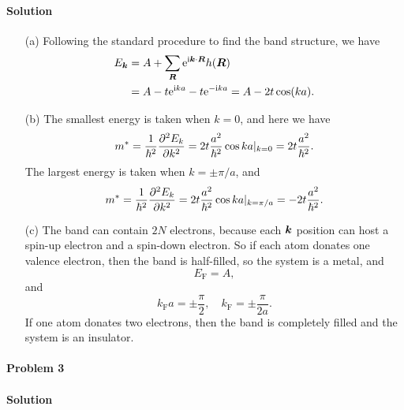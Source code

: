 \documentclass[hyperref, a4paper]{article}
\newcommand*{\ii}{\mathrm{i}}
\newcommand*{\ee}{\mathrm{e}}
\begin{document}
\paragraph{Solution} \begin{itemize}
\item[(a)] Following the standard procedure to find the band structure, we have 
\begin{equation}
    \begin{aligned}
        E_{\vb*{k}} &= A + \sum_{\vb*{R}} \ee^{\ii \vb*{k} \cdot \vb*{R}} h(\vb*{R}) \\
        &= A - t \ee^{\ii k a} - t \ee^{- \ii k a} = A - 2 t \cos(ka).
    \end{aligned}
\end{equation}
\item[(b)] The smallest energy is taken when $k = 0$,
and here we have 
\begin{equation}
    m^* = \frac{1}{\hbar^2} \pdv[2]{E_k}{k} = 2 t \frac{a^2}{\hbar^2} \cos ka |_{k = 0} = 2 t \frac{a^2}{\hbar^2}.
\end{equation}
The largest energy is taken when $k = \pm \pi / a$,
and 
\begin{equation}
    m^* = \frac{1}{\hbar^2} \pdv[2]{E_k}{k} = 2 t \frac{a^2}{\hbar^2} \cos ka |_{k = \pi / a} = - 2 t \frac{a^2}{\hbar^2}.
\end{equation}

\item[(c)] The band can contain $2N$ electrons,
because each $\vb*{k}$ position can host a spin-up electron and a spin-down electron.
So if each atom donates one valence electron,
then the band is half-filled,
so the system is a metal, and
\begin{equation}
    E_\text{F} = A,
\end{equation}
and 
\begin{equation}
    k_{\text{F}} a = \pm \frac{\pi}{2}, \quad k_{\text{F}} = \pm \frac{\pi}{2a}.
\end{equation}
If one atom donates two electrons,
then the band is completely filled and the system is an insulator.

\end{itemize}

\paragraph{Problem 3}

\paragraph{Solution} 
\end{document}
